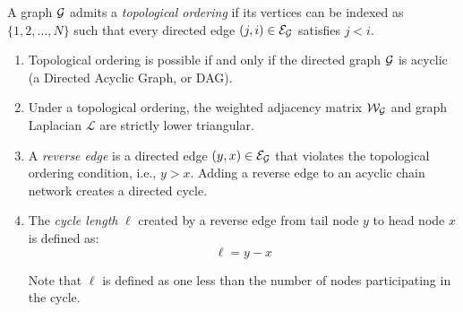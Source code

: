 \begin{definition}\label{def:topological_ordering}
A graph $\mathcal{G}$ admits a \emph{topological ordering} if its vertices can be indexed as $\{1, 2, \dots, N \}$ such that every directed edge $(j, i) \in {\mathcal{E}}_{\mathcal{G}}$ satisfies $j < i$.
\begin{enumerate}
    \item Topological ordering is possible if and only if the directed graph $\mathcal{G}$ is acyclic (a Directed Acyclic Graph, or DAG).
    \item Under a topological ordering, the weighted adjacency matrix ${\mathcal{W}}_{\mathcal{G}}$ and graph Laplacian $\mathcal{L}$ are strictly lower triangular.
    \item A \emph{reverse edge} is a directed edge $(y, x) \in {\mathcal{E}}_{\mathcal{G}}$ that violates the topological ordering condition, i.e., $y > x$. Adding a reverse edge to an acyclic chain network creates a directed cycle.
    \item The \emph{cycle length} $\ell$ created by a reverse edge from tail node $y$ to head node $x$ is defined as:
    \begin{equation}\label{eq:cycle_length_def}
        \ell = y - x
    \end{equation}
    \begin{remark}
        Note that $\ell$ is defined as one less than the number of nodes participating in the cycle.
    \end{remark}
\end{enumerate}
\end{definition}

